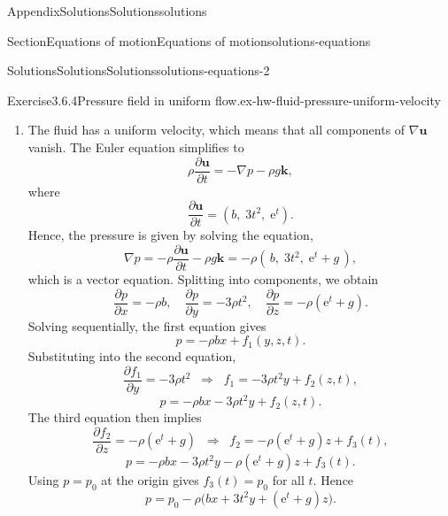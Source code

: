 \documentclass[oneside,10pt,]{book}
\numberwithin{equation}{section}
\newcommand{\e}{\mathrm{e}}
\newcommand{\pd}[2]{\frac{\partial#1}{\partial#2}}
\newcommand{\bu}{\boldsymbol{u}}
\newcommand{\bk}{\boldsymbol{k}}
\begin{document}
\begin{appendixptx}{Appendix}{Solutions}{}{Solutions}{}{}{solutions}
\begin{sectionptx}{Section}{Equations of motion}{}{Equations of motion}{}{}{solutions-equations}
\begin{solutions-subsection-numberless}{Solutions}{Solutions}{}{Solutions}{}{}{solutions-equations-2}
\begin{divisionsolution}{Exercise}{3.6.4}{Pressure field in uniform flow.}{ex-hw-fluid-pressure-uniform-velocity}%
\begin{enumerate}[font=\bfseries,label=(\alph*),ref=\alph*]%
\item[(a)]\noindent\hypertarget{ex-hw-fluid-pressure-uniform-velocity-3-2-main}{}The fluid has a uniform velocity, which means that all components of \(\nabla\bu\) vanish. The Euler equation simplifies to%
\begin{equation*}
\rho\pd{\bu}{t}=-\nabla p-\rho g \bk,
\end{equation*}
where%
\begin{equation*}
\pd{\bu}{t}=(b, \; 3t^2, \; \e^t).
\end{equation*}
Hence, the pressure is given by solving the equation,%
\begin{equation*}
\nabla p = -\rho \pd{\bu}{t} - \rho g \bk
= -\rho (\, b, \; 3t^2, \; \e^t + g \,),
\end{equation*}
which is a vector equation. Splitting into components, we obtain%
\begin{equation*}
\frac{\partial p}{\partial x} = -\rho b, \quad
\frac{\partial p}{\partial y} = -3\rho t^2, \quad
\frac{\partial p}{\partial z} = -\rho (\e^t + g).
\end{equation*}
Solving sequentially, the first equation gives%
\begin{equation*}
p = -\rho b x + f_1(y,z,t).
\end{equation*}
Substituting into the second equation,%
\begin{equation*}
\frac{\partial f_1}{\partial y} = -3\rho t^2
\;\;\Rightarrow\;\;
f_1 = -3\rho t^2 y + f_2(z,t),
\end{equation*}
%
\begin{equation*}
p = -\rho b x - 3\rho t^2 y + f_2(z,t).
\end{equation*}
The third equation then implies%
\begin{equation*}
\frac{\partial f_2}{\partial z} = -\rho(\e^t+g)
\;\;\Rightarrow\;\;
f_2 = -\rho(\e^t+g)z + f_3(t),
\end{equation*}
%
\begin{equation*}
p = -\rho b x - 3\rho t^2 y - \rho(\e^t+g)z + f_3(t).
\end{equation*}
Using \(p
= p_0\) at the origin gives \(f_3(t) = p_0\) for all \(t\). Hence%
\begin{equation*}
p = p_0 - \rho \big(bx + 3t^2 y + (\e^t + g)z \big).
\end{equation*}

\end{enumerate}
\end{divisionsolution}
\end{solutions-subsection-numberless}
\end{sectionptx}
\end{appendixptx}
\end{document}
